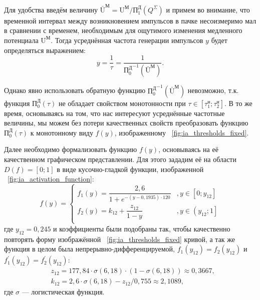 
Для удобства введём величину $\bar{\text{U}}^\text{М} = \text{U}^\text{М} / \text{П}_{1}^\text{Д}(Q^\Sigma)$ и примем во внимание, что временной интервал между возникновением импульсов в пачке несоизмеримо мал в сравнении с временем, необходимым для ощутимого изменения медленного потенциала $\text{U}^\text{М}$. Тогда усреднённая частота генерации импульсов $y$ будет определяться выражением: 
$$ y = \dfrac{1}{\tau} = \dfrac{1}{{\text{П}_{0}^\text{Д}}^{-1}(\bar{\text{U}}^\text{М})}.$$

Однако явно использовать обратную функцию ${\text{П}_{0}^\text{Д}}^{-1}(\bar{\text{U}}^\text{М})$ невозможно, т.к. функция $\text{П}_{0}^\text{Д}(\tau)$ не обладает свойством монотонности при $\tau \in \left[ \tau_{1}^{\text{н}}; \tau_{2}^{\text{н}} \right]$. В то же время, основываясь на том, что нас интересуют усреднённые частотные величины, мы можем без потери качественных свойств преобразовать функцию $\text{П}_{0}^\text{Д}(\tau)$ к монотонному виду $f(y)$, изображенному \onfigure~\ref{fig:ia_thresholds_fixed}.


Далее необходимо формализовать функцию $f(y)$, основываясь на её качественном графическом представлении. Для этого зададим её на области  $D(f) = \left[0; 1\right]$ в виде кусочно-гладкой функции, изображенной \onfigure~\ref{fig:ia_activation_function}:
$$
    f(y) = 
    \begin{cases}
        f_{1}(y) = \dfrac{2,6}{1 + e^{\displaystyle -(y - 0,1935) \cdot 120}}   &, y \in \left[0; y_{12}\right]    \\
        f_{2}(y) = k_{12} + \dfrac{z_{12}}{1 - y}                               &, y \in \left(y_{12}; 1\right]    \\
    \end{cases}
$$
где $y_{12} = 0,245$ и коэффициенты были подобраны так, чтобы качественно повторять форму изображённой \onfigure~\ref{fig:ia_thresholds_fixed} кривой, а так же функция в целом была непрерывно-дифференцируемой, \ie $f_{1}(y_{12}) = f_{2}(y_{12})$ и $f^{\prime}_{1}(y_{12}) = f^{\prime}_{2}(y_{12})$:
\begin{align*}
    &z_{12} = 177,84 \cdot \sigma\left(6,18\right) \cdot \left(1 - \sigma\left(6,18\right)\right) \approx 0,3667, \\
    &k_{12} = 2,6 \cdot \sigma\left(6,18\right) - z_{12} / 0,755 \approx 2,1089,
\end{align*}
где $\sigma$ --- логистическая функция.

